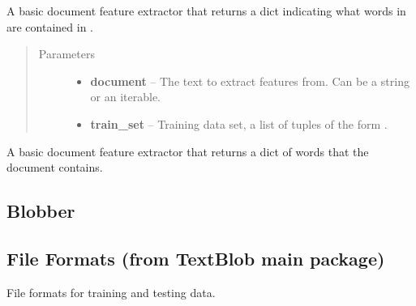 \documentclass[letterpaper,10pt,english]{sphinxmanual}
\begin{document}

\begin{fulllineitems}
\label{api_reference:textblob.classifiers.basic_extractor}
A basic document feature extractor that returns a dict indicating
what words in  are contained in .
\begin{quote}\begin{description}
\item[{Parameters}] \leavevmode\begin{itemize}
\item {} 
\textbf{document} -- The text to extract features from. Can be a string or an iterable.

\item {} 
\textbf{train\_set} -- Training data set, a list of tuples of the form
.

\end{itemize}

\end{description}\end{quote}

\end{fulllineitems}


\begin{fulllineitems}
\label{api_reference:textblob.classifiers.contains_extractor}
A basic document feature extractor that returns a dict of words that
the document contains.

\end{fulllineitems}



\subsection{Blobber}
\label{api_reference:blobber}

\subsection{File Formats (from TextBlob main package)}
\label{api_reference:module-textblob.formats}\label{api_reference:file-formats-from-textblob-main-package}
File formats for training and testing data.
\end{document}
